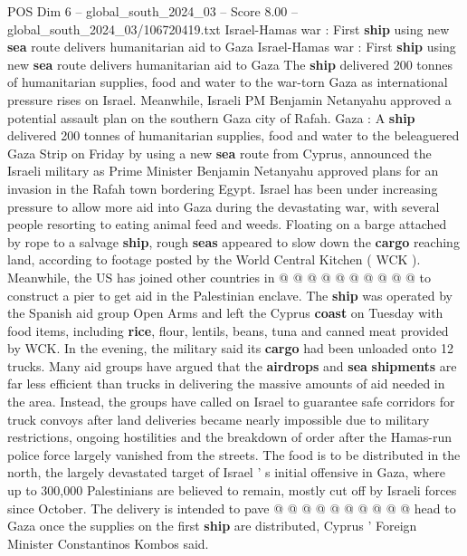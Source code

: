 \begin{textsample}{POS Dim 6 – global\_south\_2024\_03 – Score 8.00 – global\_south\_2024\_03/106720419.txt}  \label{ex:f6_pos_070}
Israel-Hamas war : First \textbf{ship} using new \textbf{sea} route delivers humanitarian aid to Gaza Israel-Hamas war : First \textbf{ship} using new \textbf{sea} route delivers humanitarian aid to Gaza The \textbf{ship} delivered 200 tonnes of humanitarian supplies, food and water to the war-torn Gaza as international pressure rises on Israel.
Meanwhile, Israeli PM Benjamin Netanyahu approved a potential assault plan on the southern Gaza city of Rafah.
Gaza : A \textbf{ship} delivered 200 tonnes of humanitarian supplies, food and water to the beleaguered Gaza Strip on Friday by using a new \textbf{sea} route from Cyprus, announced the Israeli military as Prime Minister Benjamin Netanyahu approved plans for an invasion in the Rafah town bordering Egypt.
Israel has been under increasing pressure to allow more aid into Gaza during the devastating war, with several people resorting to eating animal feed and weeds.
Floating on a barge attached by rope to a salvage \textbf{ship}, rough \textbf{seas} appeared to slow down the \textbf{cargo} reaching land, according to footage posted by the World Central Kitchen ( WCK ).
Meanwhile, the US has joined other countries in @ @ @ @ @ @ @ @ @ @ to construct a pier to get aid in the Palestinian enclave.
The \textbf{ship} was operated by the Spanish aid group Open Arms and left the Cyprus \textbf{coast} on Tuesday with food items, including \textbf{rice}, flour, lentils, beans, tuna and canned meat provided by WCK.
In the evening, the military said its \textbf{cargo} had been unloaded onto 12 trucks.
Many aid groups have argued that the \textbf{airdrops} and \textbf{sea} \textbf{shipments} are far less efficient than trucks in delivering the massive amounts of aid needed in the area.
Instead, the groups have called on Israel to guarantee safe corridors for truck convoys after land deliveries became nearly impossible due to military restrictions, ongoing hostilities and the breakdown of order after the Hamas-run police force largely vanished from the streets.
The food is to be distributed in the north, the largely devastated target of Israel ' s initial offensive in Gaza, where up to 300,000 Palestinians are believed to remain, mostly cut off by Israeli forces since October.
The delivery is intended to pave @ @ @ @ @ @ @ @ @ @ head to Gaza once the supplies on the first \textbf{ship} are distributed, Cyprus ' Foreign Minister Constantinos Kombos said.

\end{textsample}
